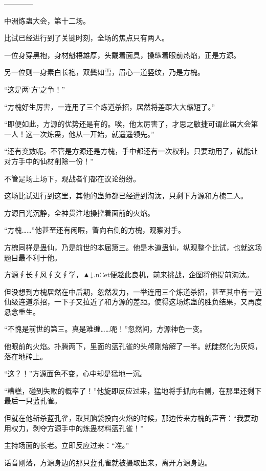 
\begin{this_body}

------------

中洲炼蛊大会，第十二场。

比试已经进行到了关键时刻，全场的焦点只有两人。

一位身穿黑袍，身材魁梧雄厚，头戴着面具，操纵着眼前热焰，正是方源。

另一位则一身素白长袍，双鬓如雪，眉心一道竖纹，乃是方槐。

“这是两‘方’之争！”

“方槐好生厉害，一连用了三个炼道杀招，居然将差距大大缩短了。”

“即便如此，方源的优势还是有的。唉，他太厉害了，才思之敏捷可谓此届大会第一人！这一次炼蛊，他从一开始，就遥遥领先。”

“还有变数呢。不管是方源还是方槐，手中都还有一次权利。只要动用了，就能让对方手中的仙材削除一份！”

不管是场上场下，观战者们都在议论纷纷。

这场比试进行到这里，其他的蛊师都已经遭到淘汰，只剩下方源和方槐二人。

方源目光沉静，全神贯注地操控着面前的火焰。

“方槐……”他甚至还有闲暇，瞥向右侧的方槐，观察对手。

方槐同样是蛊仙，乃是前世的本届第三。他是木道蛊仙，纵观整个比试，也就这场题目最不利于他。

方源∮长∮风∮文∮学，▲↓.n∷et便趁此良机，前来挑战，企图将他提前淘汰。

但没想到方槐居然在中后期，忽然发力，一举连用三个炼道杀招，甚至其中有一道仙级连道杀招，一下子又拉近了和方源的差距。使得这场炼蛊的胜负结果，又再度悬念重生。

“不愧是前世的第三。真是难缠……呃！”忽然间，方源神色一变。

他眼前的火焰。扑腾两下，里面的蓝孔雀的头颅刚熔解了一半。就陡然化为灰烬，落在地砖上。

“这？！”方源面色不变，心中却是猛地一沉。

“糟糕，碰到失败的概率了！”他旋即反应过来，猛地将手抓向右侧，在那里还剩下最后一只蓝孔雀。

但就在他斩杀蓝孔雀，取其脑袋投向火焰的时候，那边传来方槐的声音：“我要动用权力，剥夺方源手中的炼蛊材料蓝孔雀！”

主持场面的长老。立即反应过来：“准。”

话音刚落，方源身边的那只蓝孔雀就被摄取出来，离开方源身边。


\end{this_body}
